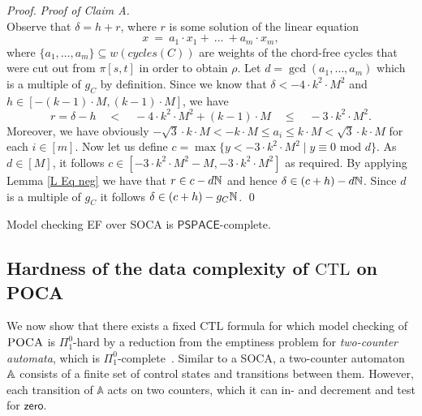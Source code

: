 \documentclass[times,envcountsame]{llncs}
\def\CTL{{\text{CTL}}}
\def\PSPACE{{\mathsf{PSPACE}}}
\newcommand{\add}[1]{\ensuremath{\mathsf{add}(#1)}}
\newcommand{\zero}{\ensuremath{\mathsf{zero}}}
\newcommand{\poca}{\textsc{POCA} }
\begin{document}
\begin{proof}
\smallskip

\noindent
{\em Proof of Claim A.}\\
\noindent
Observe that $\delta=h+r$, where $r$ is some solution
of the linear equation
$$
x\ =\ a_1\cdot x_1+\ \ldots\ +a_m\cdot x_m,
$$
where $\{a_1,\ldots, a_m\}\subseteq w(cycles(C))$ are weights of the chord-free cycles that
were cut out from $\pi[s,t]$ in order to obtain $\rho$. %
Let $d=\gcd(a_1,\ldots,a_m)$ which is a multiple of $g_C$ by definition.
Since we know that $\delta<-4\cdot k^2\cdot M^2$ and $h\in[-(k-1)\cdot M,(k-1)\cdot M]$, we have
$$
r=\delta-h\quad<\quad-4\cdot k^2\cdot M^2+(k-1)\cdot M\quad\leq\quad -3\cdot k^2\cdot M^2.
$$
Moreover, we have obviously $-\sqrt{3}\cdot k\cdot M<-k\cdot M\leq a_i\leq
k\cdot M<\sqrt{3}\cdot k\cdot M$ for each $i\in[m]$.
Now let us define $c=\max\{y<-3\cdot k^2\cdot M^2\mid y\equiv 0\text{ mod }
d\}$.
As $d\in[M]$, it follows $c\in[-3\cdot k^2\cdot M^2-M,-3\cdot k^2\cdot M^2]$ as
required.
By applying Lemma \ref{L Eq neg} we have that $r\in c-d\mathbb{N}$ and hence
$\delta\in (c+h)-d\mathbb{N}$.
Since $d$ is a multiple of $g_C$
it follows $\delta\in (c+h)-g_C\mathbb{N}$.
\qed
\end{proof}

\begin{theorem}
Model checking EF over SOCA is $\PSPACE$-complete.
\end{theorem}

\fi


\fi
\newcommand{\Two}{\mathbb{A}}
\renewcommand{\add}{\mathsf{add}}



\subsection{Hardness of the data complexity of $\CTL$ on POCA}{\label{S CTL und}}
We now show that there exists a fixed $\CTL$ formula for which model
checking of $\poca$ is $\Pi^0_1$-hard by a reduction from the emptiness
problem for \emph{two-counter automata}, which is
$\Pi^0_1$-complete~\cite{Min61}. Similar to a SOCA, a two-counter
automaton $\mathbb{A}$ consists of a finite set of control states and transitions
between them. However, each transition of $\Two$ acts on two counters,
which it can in- and decrement and test for $\zero$.

\end{document}
